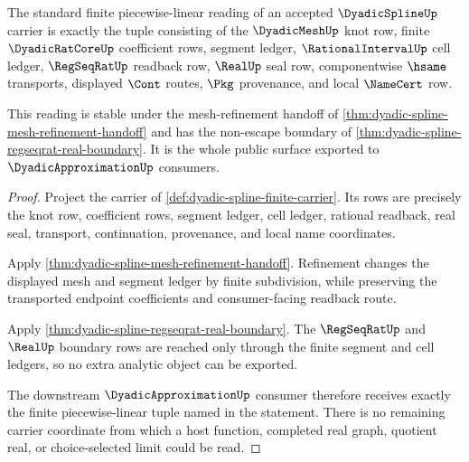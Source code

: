 \begin{theorem}
\label{thm:dyadic-spline-standard-piecewise-linear-reading}
The standard finite piecewise-linear reading of an accepted $\DyadicSplineUp$ carrier is exactly the tuple consisting of the $\DyadicMeshUp$ knot row, finite $\DyadicRatCoreUp$ coefficient rows, segment ledger, $\RationalIntervalUp$ cell ledger, $\RegSeqRatUp$ readback row, $\RealUp$ seal row, componentwise $\hsame$ transports, displayed $\Cont$ routes, $\Pkg$ provenance, and local $\NameCert$ row.

This reading is stable under the mesh-refinement handoff of \autoref{thm:dyadic-spline-mesh-refinement-handoff} and has the non-escape boundary of \autoref{thm:dyadic-spline-regseqrat-real-boundary}. It is the whole public surface exported to $\DyadicApproximationUp$ consumers.
\end{theorem}
\begin{proof}
Project the carrier of \autoref{def:dyadic-spline-finite-carrier}. Its rows are precisely the knot row, coefficient rows, segment ledger, cell ledger, rational readback, real seal, transport, continuation, provenance, and local name coordinates.

Apply \autoref{thm:dyadic-spline-mesh-refinement-handoff}. Refinement changes the displayed mesh and segment ledger by finite subdivision, while preserving the transported endpoint coefficients and consumer-facing readback route.

Apply \autoref{thm:dyadic-spline-regseqrat-real-boundary}. The $\RegSeqRatUp$ and $\RealUp$ boundary rows are reached only through the finite segment and cell ledgers, so no extra analytic object can be exported.

The downstream $\DyadicApproximationUp$ consumer therefore receives exactly the finite piecewise-linear tuple named in the statement. There is no remaining carrier coordinate from which a host function, completed real graph, quotient real, or choice-selected limit could be read.
\end{proof}

